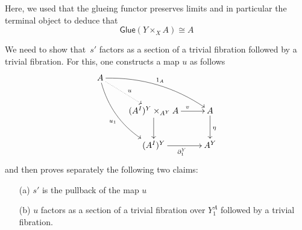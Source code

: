 \documentclass[reqno,a4paper,oneside]{amsart}
\begin{document}
Here, we used that the glueing functor preserves limits and in particular the terminal object to deduce that 
\begin{equation}
\label{equ:usethis}
\mathsf{Glue}(Y \times_X A) \cong A
\end{equation}



 \begin{center}
\end{center}




We need to show that~$s'$ factors as a section of a trivial fibration followed by a trivial fibration. 
For this, one constructs a map $u$ as follows 
\begin{equation}
\label{equ:define-u}
\begin{gathered}
\xymatrix{
A \ar@/_1pc/[ddr]_{u_1}  \ar@/^1pc/[drr]^{1_A} \ar@{.>}[dr]^{u} & & \\
  & (A^I)^Y \times_{A^Y} A \ar[r]^(.6){v} \ar[d] & A \ar[d]^{\eta} \\ 
 & (A^I)^Y \ar[r]_{\partial_1^Y} & A^Y }
 \end{gathered}
 \end{equation}
 and then proves separately the following two claims:
\begin{enumerate}
\item[(a)] $s'$ is the pullback of the map $u$
\item[(b)] $u$ factors as a section of a trivial fibration over $Y_1^A$ followed by a trivial fibration. 
\end{enumerate} 

 \begin{center}
\end{center} 
\end{document}
